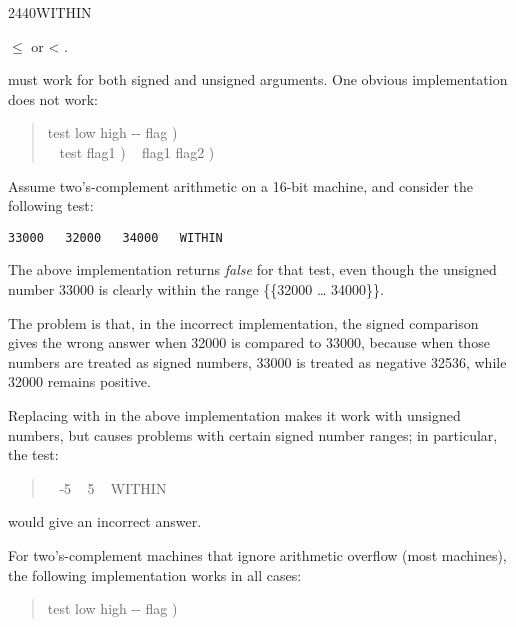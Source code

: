 \begin{worddef}{2440}{WITHIN}
\begin{defer}
\begin{center}
			 $\le$  or  < .
		\end{center}
		 must work for both signed and unsigned arguments.
		One obvious implementation does not work:
		\begin{quote}\ttfamily
			\word{:}   test low high -{}- flag ) \\
			\tab {} ~     test flag1 )
				~     flag1 flag2 )
				 \\
			\word{;}
		\end{quote}
		Assume two's-complement arithmetic on a 16-bit machine, and
		consider the following test:

		\tab \texttt{33000 ~ 32000 ~ 34000 ~ WITHIN}

		The above implementation returns \emph{false} for that test,
		even though the unsigned number 33000 is clearly within the
		range \{\{32000 {\ldots} 34000\}\}.

		The problem is that, in the incorrect implementation, the
		signed comparison  gives the wrong answer when 32000
		is compared to 33000, because when those numbers are treated
		as signed numbers, 33000 is treated as negative 32536, while
		32000 remains positive.

		Replacing  with  in the above implementation
		makes it work with unsigned numbers, but causes problems with
		certain signed number ranges; in particular, the test:
		\begin{quote} ~ -5 ~ 5 ~ WITHIN
		\end{quote}
		would give an incorrect answer.

		For two's-complement machines that ignore arithmetic overflow
		(most machines), the following implementation works in all
		cases:
		\begin{quote}\ttfamily
			\word{:}   test low high -{}- flag )	~
				 \word{-}  \word{-}   ~
			\word{;}
		\end{quote}
	\end{defer}
\end{worddef}


